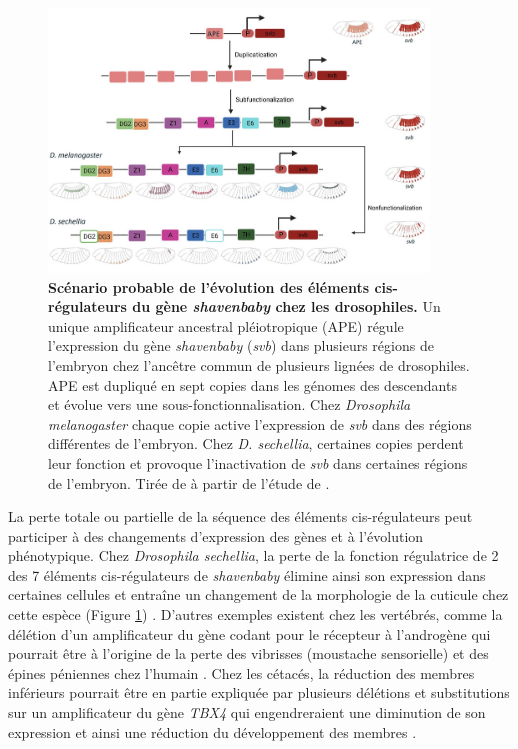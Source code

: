 \begin{figure}[h]
 \centering
 \includegraphics[width=0.9\textwidth, page=1] {figures/introduction/fig33.png}
 \caption[Scénario probable de l'évolution des éléments \gls{cis}-régulateurs du gène \textit{shavenbaby} chez les drosophiles.]{
 \textbf{Scénario probable de l'évolution des éléments \gls{cis}-régulateurs du gène \textit{shavenbaby} chez les drosophiles.}
 Un unique \gls{amplificateur} ancestral pléiotropique (APE) régule l'expression du gène \textit{shavenbaby} (\textit{svb}) dans plusieurs régions de l'embryon chez l'ancêtre commun de plusieurs lignées de drosophiles. APE est dupliqué en sept copies dans les génomes des descendants et évolue vers une sous-fonctionnalisation. Chez \textit{Drosophila melanogaster} chaque copie active l'expression de \textit{svb} dans des régions différentes de l'embryon. Chez \textit{D. sechellia}, certaines copies perdent leur fonction et provoque l'inactivation de \textit{svb} dans certaines régions de l'embryon. Tirée de \citet{murugesan_evolution_2022} à partir de l'étude de \citep{kittelmann_complex_2021}.\\
 }
 \label{fig:Fig33}
\end{figure}

La perte totale ou partielle de la séquence des éléments \gls{cis}-régulateurs peut participer à des changements d’expression des gènes et à l’évolution phénotypique. Chez \textit{Drosophila sechellia}, la perte de la fonction régulatrice de 2 des 7 éléments \gls{cis}-régulateurs de \textit{shavenbaby} élimine ainsi son expression dans certaines cellules et entraîne un changement de la morphologie de la cuticule chez cette espèce (Figure \ref{fig:Fig33}) \citep{kittelmann_complex_2021}. D’autres exemples existent chez les vertébrés, comme la délétion d’un \gls{amplificateur} du gène codant pour le récepteur à l’androgène qui pourrait être à l’origine de la perte des vibrisses (moustache sensorielle) et des épines péniennes chez l’humain \citep{mclean_human-specific_2011}. Chez les cétacés, la réduction des membres inférieurs pourrait être en partie expliquée par plusieurs délétions et substitutions sur un \gls{amplificateur} du gène \textit{TBX4} qui engendreraient une diminution de son expression et ainsi une réduction du développement des membres \citep{liang_divergence_2022}. \\

